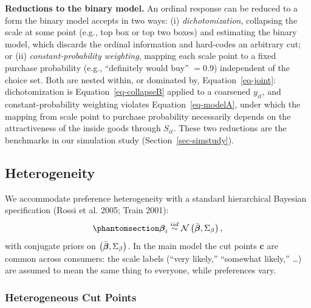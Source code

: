 \documentclass[
  letterpaper,
  DIV=11,
  numbers=noendperiod]{scrartcl}
\theoremstyle{plain}
\theoremstyle{plain}
\theoremstyle{remark}
\begin{document}
\textbf{Reductions to the binary model.} An ordinal response can be
reduced to a form the binary model accepts in two ways: (i)
\emph{dichotomization}, collapsing the scale at some point (e.g., top
box or top two boxes) and estimating the binary model, which discards
the ordinal information and hard-codes an arbitrary cut; or (ii)
\emph{constant-probability weighting}, mapping each scale point to a
fixed purchase probability (e.g., ``definitely would buy'' \(= 0.9\))
independent of the choice set. Both are nested within, or dominated by,
Equation~\ref{eq-joint}: dichotomization is Equation~\ref{eq-collapseB}
applied to a coarsened \(y_{it}\), and constant-probability weighting
violates Equation~\ref{eq-modelA}, under which the mapping from scale
point to purchase probability necessarily depends on the attractiveness
of the inside goods through \(S_{it}\). These two reductions are the
benchmarks in our simulation study (Section~\ref{sec-simstudy}).

\subsection{Heterogeneity}\label{sec-heterogeneity}

We accommodate preference heterogeneity with a standard hierarchical
Bayesian specification (Rossi et al. 2005; Train 2001):
\begin{equation}\protect\phantomsection\label{eq-hb}{
\bfbeta_i \iid \mathcal{N} \left( \betabar, \Sigma_{\beta} \right),
}\end{equation} with conjugate priors on
\(\left( \bar{\boldsymbol{\beta}}, \Sigma_{\beta} \right)\). In the main model the cut
points \(\mathbf{c}\) are common across consumers: the scale labels
(``very likely,'' ``somewhat likely,'' \ldots) are assumed to mean the
same thing to everyone, while preferences vary.

\subsubsection{Heterogeneous Cut Points}\label{sec-hetcut}
\end{document}
